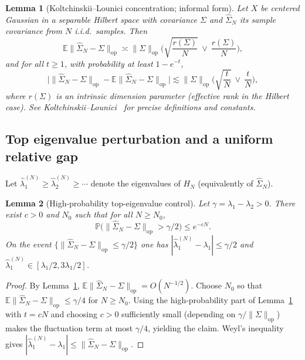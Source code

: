 \documentclass[11pt]{article}
\newtheorem{lemma}{Lemma}
\begin{document}
\begin{lemma}[Koltchinskii--Lounici concentration; informal form]\label{lem:KL}
Let $X$ be centered Gaussian in a separable Hilbert space with covariance $\Sigma$ and
$\widehat\Sigma_N$ its sample covariance from $N$ i.i.d.\ samples. Then
\[
\mathbb E\|\widehat\Sigma_N-\Sigma\|_{\mathrm{op}}
\asymp
\|\Sigma\|_{\mathrm{op}}\Big(\sqrt{\frac{r(\Sigma)}{N}}\ \vee\ \frac{r(\Sigma)}{N}\Big),
\]
and for all $t\ge 1$, with probability at least $1-e^{-t}$,
\[
\Big|\|\widehat\Sigma_N-\Sigma\|_{\mathrm{op}}-\mathbb E\|\widehat\Sigma_N-\Sigma\|_{\mathrm{op}}\Big|
\lesssim
\|\Sigma\|_{\mathrm{op}}\Big(\sqrt{\frac{t}{N}}\ \vee\ \frac{t}{N}\Big),
\]
where $r(\Sigma)$ is an intrinsic dimension parameter (effective rank in the Hilbert case).
See Koltchinskii--Lounici~\cite{KL2017} for precise definitions and constants.
\end{lemma}

\subsection{Top eigenvalue perturbation and a uniform relative gap}

Let $\widehat\lambda_1^{(N)}\ge \widehat\lambda_2^{(N)}\ge\cdots$ denote the eigenvalues of $H_N$
(equivalently of $\widehat\Sigma_N$).

\begin{lemma}[High-probability top-eigenvalue control]\label{lem:top-eig}
Let $\gamma=\lambda_1-\lambda_2>0$. There exist $c>0$ and $N_0$ such that for all $N\ge N_0$,
\[
\mathbb P\big(\|\widehat\Sigma_N-\Sigma\|_{\mathrm{op}}>\gamma/2\big)\le e^{-cN}.
\]
On the event $\{\|\widehat\Sigma_N-\Sigma\|_{\mathrm{op}}\le\gamma/2\}$ one has
$|\widehat\lambda_1^{(N)}-\lambda_1|\le \gamma/2$ and $\widehat\lambda_1^{(N)}\in[\lambda_1/2,3\lambda_1/2]$.
\end{lemma}

\begin{proof}
By Lemma~\ref{lem:KL}, $\mathbb E\|\widehat\Sigma_N-\Sigma\|_{\mathrm{op}}=O(N^{-1/2})$.
Choose $N_0$ so that $\mathbb E\|\widehat\Sigma_N-\Sigma\|_{\mathrm{op}}\le\gamma/4$ for $N\ge N_0$.
Using the high-probability part of Lemma~\ref{lem:KL} with $t=cN$ and choosing $c>0$ sufficiently small
(depending on $\gamma/\|\Sigma\|_{\mathrm{op}}$) makes the fluctuation term at most $\gamma/4$, yielding the claim.
Weyl's inequality gives $|\widehat\lambda_1^{(N)}-\lambda_1|\le\|\widehat\Sigma_N-\Sigma\|_{\mathrm{op}}$.
\end{proof}
\end{document}
